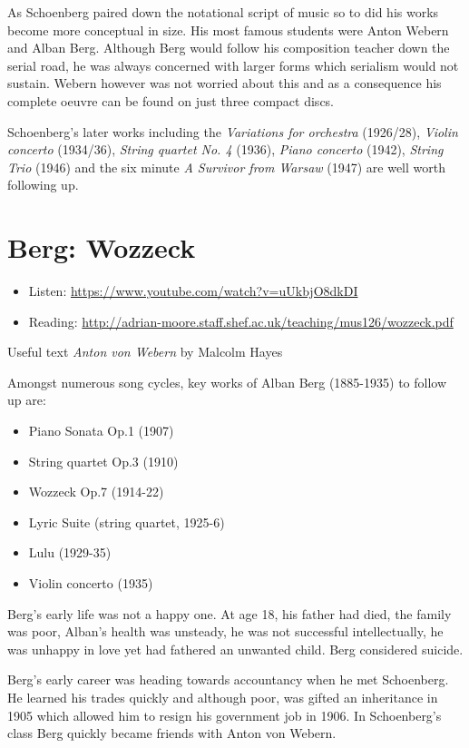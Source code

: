 

As Schoenberg paired down the notational script of music so to did his works become more conceptual in size. His most famous students were Anton Webern and Alban Berg. Although Berg would follow his composition teacher down the serial road, he was always concerned with larger forms which serialism would not sustain. Webern however was not worried about this and as a consequence his complete oeuvre can be found on just three compact discs. 

Schoenberg's later works including the \textit{Variations for orchestra} (1926/28), \textit{Violin concerto} (1934/36), \textit{String quartet No. 4} (1936), \textit{Piano concerto} (1942), \textit{String Trio} (1946)
and the six minute \textit{A Survivor from Warsaw} (1947) are well worth following up. 
 


\section{Berg: Wozzeck}
\begin{itemize}
\item Listen: \url{https://www.youtube.com/watch?v=uUkbjO8dkDI}
\item Reading: \url{http://adrian-moore.staff.shef.ac.uk/teaching/mus126/wozzeck.pdf}
\end{itemize}

Useful text \textit{Anton von Webern} by Malcolm Hayes \citeyearpar{hayes1995anton}

Amongst numerous song cycles, key works of Alban Berg (1885-1935) to follow up are:
\begin{itemize}
\item Piano Sonata Op.1 (1907)
\item String quartet Op.3 (1910)
\item Wozzeck Op.7 (1914-22)
\item Lyric Suite (string quartet, 1925-6)
\item Lulu (1929-35)
\item Violin concerto (1935) 
\end{itemize}

Berg's early life was not a happy one. At age 18, his father had died, the family was poor, Alban's health was unsteady, he was not successful intellectually, he was unhappy in love yet had fathered an unwanted child. Berg considered suicide. 

Berg's early career was heading towards accountancy when he met Schoenberg. He learned his trades quickly and although poor, was gifted an inheritance in 1905 which allowed him to resign his government job in 1906. In Schoenberg's class Berg quickly became friends with Anton von Webern.

